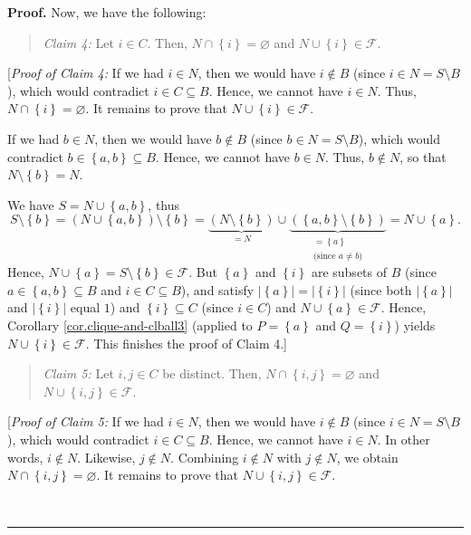 \documentclass[numbers=enddot,12pt,final,onecolumn,notitlepage]{scrartcl}%
\theoremstyle{definition}
\newenvironment{statement}{\begin{quote}}{\end{quote}}
\newenvironment{proof}[1][Proof]{\noindent\textbf{#1.} }{\ \rule{0.5em}{0.5em}}
\theoremstyle{plainsl}
\begin{document}
\begin{proof}
Now, we have the following:

\begin{statement}
\textit{Claim 4:} Let $i\in C$. Then, $N\cap\left\{  i\right\}  =\varnothing$
and $N\cup\left\{  i\right\}  \in\mathcal{F}$.
\end{statement}

[\textit{Proof of Claim 4:} If we had $i\in N$, then we would have $i\notin B$
(since $i\in N=S\setminus B$), which would contradict $i\in C\subseteq B$.
Hence, we cannot have $i\in N$. Thus, $N\cap\left\{  i\right\}  =\varnothing$.
It remains to prove that $N\cup\left\{  i\right\}  \in\mathcal{F}$.

If we had $b\in N$, then we would have $b\notin B$ (since $b\in N=S\setminus
B$), which would contradict $b\in\left\{  a,b\right\}  \subseteq B$. Hence, we
cannot have $b\in N$. Thus, $b\notin N$, so that $N\setminus\left\{
b\right\}  =N$.

We have $S=N\cup\left\{  a,b\right\}  $, thus%
\[
S\setminus\left\{  b\right\}  =\left(  N\cup\left\{  a,b\right\}  \right)
\setminus\left\{  b\right\}  =\underbrace{\left(  N\setminus\left\{
b\right\}  \right)  }_{=N}\cup\underbrace{\left(  \left\{  a,b\right\}
\setminus\left\{  b\right\}  \right)  }_{\substack{=\left\{  a\right\}
\\\text{(since }a\neq b\text{)}}}=N\cup\left\{  a\right\}  .
\]
Hence, $N\cup\left\{  a\right\}  =S\setminus\left\{  b\right\}  \in
\mathcal{F}$. But $\left\{  a\right\}  $ and $\left\{  i\right\}  $ are
subsets of $B$ (since $a\in\left\{  a,b\right\}  \subseteq B$ and $i\in
C\subseteq B$), and satisfy $\left\vert \left\{  a\right\}  \right\vert
=\left\vert \left\{  i\right\}  \right\vert $ (since both $\left\vert \left\{
a\right\}  \right\vert $ and $\left\vert \left\{  i\right\}  \right\vert $
equal $1$) and $\left\{  i\right\}  \subseteq C$ (since $i\in C$) and
$N\cup\left\{  a\right\}  \in\mathcal{F}$. Hence, Corollary
\ref{cor.clique-and-clball3} (applied to $P=\left\{  a\right\}  $ and
$Q=\left\{  i\right\}  $) yields $N\cup\left\{  i\right\}  \in\mathcal{F}$.
This finishes the proof of Claim 4.] \medskip

\begin{statement}
\textit{Claim 5:} Let $i,j\in C$ be distinct. Then, $N\cap\left\{
i,j\right\}  =\varnothing$ and $N\cup\left\{  i,j\right\}  \in\mathcal{F}$.
\end{statement}

[\textit{Proof of Claim 5:} If we had $i\in N$, then we would have $i\notin B$
(since $i\in N=S\setminus B$), which would contradict $i\in C\subseteq B$.
Hence, we cannot have $i\in N$. In other words, $i\notin N$. Likewise,
$j\notin N$. Combining $i\notin N$ with $j\notin N$, we obtain $N\cap\left\{
i,j\right\}  =\varnothing$. It remains to prove that $N\cup\left\{
i,j\right\}  \in\mathcal{F}$.


\end{proof}
\end{document}
